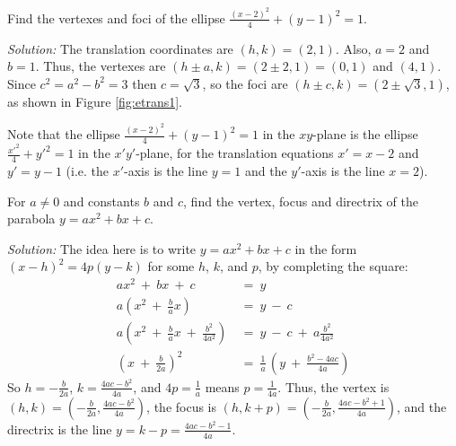 \begin{exmp}
\noindent Find the vertexes and foci of the ellipse
$\frac{(x-2)^2}{4} + (y-1)^2 = 1$.\vspace{1mm}
\par\noindent\emph{Solution:} The translation coordinates are
$(h,k)=(2,1)$. Also, $a=2$ and $b=1$. Thus, the vertexes
are $(h \pm a,k) = (2 \pm 2,1) = (0,1)$ and $(4,1)$. Since $c^2=a^2-b^2 = 3$
then $c=\sqrt{3}$, so the foci are $(h \pm c,k) = (2 \pm \sqrt{3},1)$, as shown
in Figure \ref{fig:etrans1}.

Note that the ellipse $\frac{(x-2)^2}{4} + (y-1)^2 = 1$ in the $xy$-plane is the
ellipse $\frac{x'^2}{4} + y'^2 = 1$ in the $x'y'$-plane, for the translation
equations $x'=x-2$ and $y'=y-1$ (i.e. the $x'$-axis is the line $y=1$ and the
$y'$-axis is the line $x=2$).
\end{exmp}
\divider
\newpage
\begin{exmp}\label{exmp:ptrans1}
\noindent For $a \ne 0$ and constants $b$ and $c$, find the vertex, focus and
directrix of the parabola $y=ax^2+bx+c$.\vspace{1mm}
\par\noindent\emph{Solution:} The idea here is to write $y=ax^2+bx+c$ in the
form $(x-h)^2 = 4p(y-k)$ for some $h$, $k$, and $p$, by completing the square:
\begin{align*}
ax^2 ~+~ bx ~+~ c ~&=~ y\\
a\left(x^2 ~+~ \frac{b}{a}x\right) ~&=~ y ~-~ c\\[4pt]
a\left(x^2 ~+~ \frac{b}{a}x ~+~ \frac{b^2}{4a^2}\right) ~&=~ y ~-~ c ~+~ a\frac{b^2}{4a^2}\\[4pt]
\left(x ~+~ \frac{b}{2a}\right)^2 ~&=~ \frac{1}{a}\,\left(y ~+~ \frac{b^2 - 4ac}{4a}\right)
\end{align*}
So $h=-\frac{b}{2a}$, $k=\frac{4ac - b^2}{4a}$, and $4p=\frac{1}{a}$ means
$p=\frac{1}{4a}$. Thus, the vertex is
$(h,k)=\left(-\frac{b}{2a},\frac{4ac - b^2}{4a}\right)$, the focus is
$(h,k+p)=\left(-\frac{b}{2a},\frac{4ac - b^2 + 1}{4a}\right)$, and the directrix
is the line $y=k-p=\frac{4ac - b^2 - 1}{4a}$.
\end{exmp}\vspace{-2mm}
\divider
\vspace{2mm}

